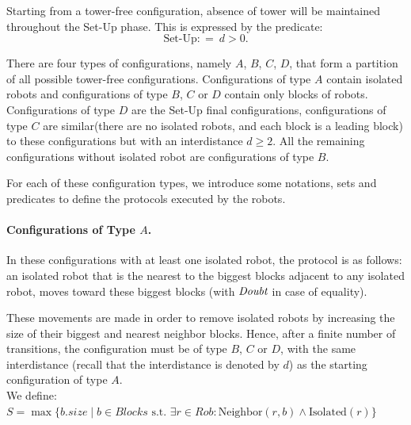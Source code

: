  Starting from a tower-free configuration, absence of tower will be
 maintained throughout the Set-Up phase. This is expressed by the 
 predicate:  $$\textrm{Set-Up}: = \ d > 0.$$  

 There are four types of configurations, namely $A$, $B$, $C$, $D$, 
 that form a partition of all possible tower-free
 configurations. Configurations of type $A$ contain isolated robots
 and configurations of type $B$, $C$ or $D$ contain only blocks of
 robots. Configurations of type $D$ are the Set-Up final
 configurations, configurations of type $C$ are similar(there are no 
 isolated robots, and each block is a leading block) to these
 configurations but with an interdistance $d \geq 2$. All the 
 remaining configurations without isolated robot are
 configurations of type $B$.

 For each of these configuration types, we introduce some notations, 
 sets and predicates to define the protocols executed by the robots.

\paragraph{Configurations of Type $A$.}
\label{conf-A-FLO}
In these configurations with at least one isolated robot, the protocol
is as follows: an isolated robot that is the nearest to the biggest
blocks adjacent to any isolated robot, moves toward these biggest
blocks (with $\textit{Doubt}$ in case of equality).

These movements are made in order to remove isolated robots by
increasing the size of their biggest and nearest neighbor blocks.
Hence, after a finite number of transitions, the configuration must be
of type $B$, $C$ or $D$, with the same interdistance (recall that the
interdistance is denoted by $d$) as the starting
configuration of type $A$.\\
We define: \\
$S= \max \{b.\textit{size} \mid  b \in Blocks
  \text{ s.t. } \exists r \in \textit{Rob}: \textrm{Neighbor}(r, b) \wedge \textrm{Isolated}(r)\}$

